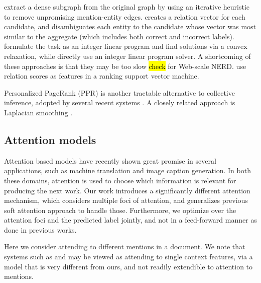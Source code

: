 \cite{Hoffart2011} extract a dense subgraph from the original graph by using an iterative heuristic to remove unpromising mention-entity edges. \cite{Cucerzan07} creates a relation vector for each candidate, and disambiguates each entity to the candidate whose vector was most similar to the aggregate (which includes both correct and incorrect labels).  formulate the task as an integer linear program and find solutions via a convex relaxation, while  directly use an integer linear program solver. A shortcoming of these approaches is that they may be too slow \hl{check} for Web-scale NERD.  use relation scores as features in a ranking support vector machine.
 
 Personalized PageRank (PPR) \cite{jeh2003scaling} is another tractable alternative to collective inference, adopted by several recent systems \cite{Han2011,He13,Alhelbawy14,Pershina2015}. A closely related approach is Laplacian smoothing \cite{Huang2014}.  

\subsection{Attention models}
Attention based models have recently shown great promise in several applications, such as machine translation and image caption generation. In both these domains, attention is used to choose which information is relevant for producing the next work. Our work introduces a significantly different attention mechanism, which considers multiple foci of attention, and generalizes previous soft attention approach to handle those. Furthermore, we optimize
over the attention foci and the predicted label jointly, and not in a feed-forward manner as done in previous works.

Here we consider attending to different mentions in a document. We note that systems such as  and  may be viewed as
attending to single context features, via a model that is very different from ours, and not readily extendible to attention to mentions.


